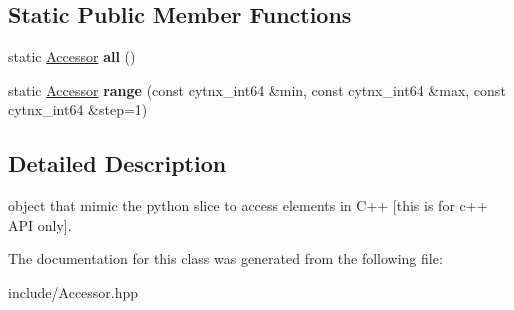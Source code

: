 \subsection*{Static Public Member Functions}
\begin{DoxyCompactItemize}
\item 
\mbox{\label{classcytnx_1_1Accessor_a71b8c4af7182a2c9144929bdef9ff4fd}} 
static \hyperlink{classcytnx_1_1Accessor}{Accessor} {\bfseries all} ()
\item 
\mbox{\label{classcytnx_1_1Accessor_a7a5a508a58b71897c3dd162195aceaa9}} 
static \hyperlink{classcytnx_1_1Accessor}{Accessor} {\bfseries range} (const cytnx\+\_\+int64 \&min, const cytnx\+\_\+int64 \&max, const cytnx\+\_\+int64 \&step=1)
\end{DoxyCompactItemize}


\subsection{Detailed Description}
object that mimic the python slice to access elements in C++ \mbox{[}this is for c++ A\+PI only\mbox{]}. 

The documentation for this class was generated from the following file\+:\begin{DoxyCompactItemize}
\item 
include/Accessor.\+hpp\end{DoxyCompactItemize}
